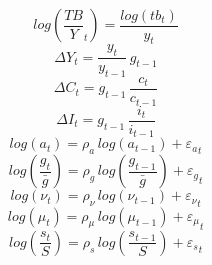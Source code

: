 \begin{dmath}
log\left({{\frac{TB}{Y}}_{t}}\right)=\frac{log\left({tb_{t}}\right)}{{y_{t}}}
\end{dmath}
\begin{dmath}
{{\Delta Y}_{t}}=\frac{{y_{t}}}{{y_{t-1}}}\, {{g}_{t-1}}
\end{dmath}
\begin{dmath}
{{\Delta C}_{t}}={{g}_{t-1}}\, \frac{{c_{t}}}{{c_{t-1}}}
\end{dmath}
\begin{dmath}
{{\Delta I}_{t}}={{g}_{t-1}}\, \frac{{i_{t}}}{{i_{t-1}}}
\end{dmath}
\begin{dmath}
log\left({a_{t}}\right)={{\rho_a}}\, log\left({a_{t-1}}\right)+{{\varepsilon_a}_{t}}
\end{dmath}
\begin{dmath}
log\left(\frac{{{g}_{t}}}{{{\bar g}}}\right)={{\rho_g}}\, log\left(\frac{{{g}_{t-1}}}{{{\bar g}}}\right)+{{\varepsilon_g}_{t}}
\end{dmath}
\begin{dmath}
log\left({{\nu}_{t}}\right)={{\rho_\nu}}\, log\left({{\nu}_{t-1}}\right)+{{\varepsilon_\nu}_{t}}
\end{dmath}
\begin{dmath}
log\left({{\mu}_{t}}\right)={{\rho_\mu}}\, log\left({{\mu}_{t-1}}\right)+{{\varepsilon_\mu}_{t}}
\end{dmath}
\begin{dmath}
log\left(\frac{{{s}_{t}}}{{{S}}}\right)={{\rho_s}}\, log\left(\frac{{{s}_{t-1}}}{{{S}}}\right)+{{\varepsilon_s}_{t}}
\end{dmath}
